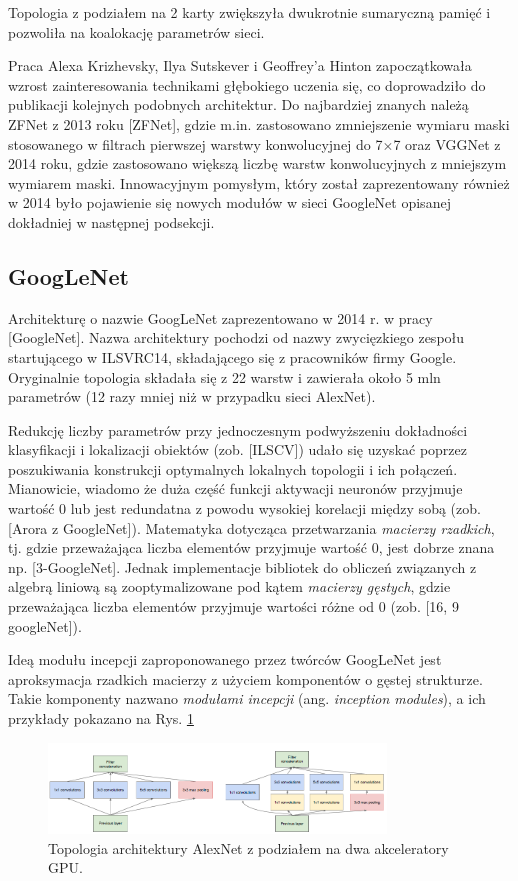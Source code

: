 Topologia z podziałem na 2 karty zwiększyła dwukrotnie sumaryczną pamięć i pozwoliła na koalokację parametrów sieci.

Praca Alexa Krizhevsky, Ilya Sutskever i Geoffrey'a Hinton zapoczątkowała wzrost zainteresowania technikami głębokiego uczenia się, co doprowadziło do publikacji kolejnych podobnych architektur. Do najbardziej znanych należą ZFNet z 2013 roku [ZFNet], gdzie m.in. zastosowano zmniejszenie wymiaru maski stosowanego w filtrach pierwszej warstwy konwolucyjnej do 7$\times$7 oraz VGGNet z 2014 roku, gdzie zastosowano większą liczbę warstw konwolucyjnych z mniejszym wymiarem maski. Innowacyjnym pomysłym, który został zaprezentowany również w 2014 było pojawienie się nowych modułów w sieci GoogleNet opisanej dokładniej w następnej podsekcji.

\subsection{GoogLeNet}

Architekturę o nazwie GoogLeNet zaprezentowano w 2014 r. w pracy [GoogleNet]. Nazwa architektury pochodzi od nazwy zwycięzkiego zespołu startującego w ILSVRC14, składającego się z pracowników firmy Google. Oryginalnie topologia składała się z 22 warstw i zawierała około 5 mln parametrów (12 razy mniej niż w przypadku sieci AlexNet). 

Redukcję liczby parametrów przy jednoczesnym podwyższeniu dokładności klasyfikacji i lokalizacji obiektów (zob. [ILSCV]) udało się uzyskać poprzez poszukiwania konstrukcji optymalnych lokalnych topologii i ich połączeń. Mianowicie, wiadomo że duża część funkcji aktywacji neuronów przyjmuje wartość 0 lub jest redundatna z powodu wysokiej korelacji między sobą (zob. [Arora z GoogleNet]). Matematyka dotycząca przetwarzania \textit{macierzy rzadkich}, tj. gdzie przeważająca liczba elementów przyjmuje wartość 0, jest dobrze znana np. [3-GoogleNet]. Jednak implementacje bibliotek do obliczeń związanych z algebrą liniową są zooptymalizowane pod kątem \textit{macierzy gęstych}, gdzie przeważająca liczba elementów przyjmuje wartości różne od 0 (zob. [16, 9 googleNet]). 

Ideą modułu incepcji zaproponowanego przez twórców GoogLeNet jest aproksymacja rzadkich macierzy z użyciem komponentów o gęstej strukturze. Takie komponenty nazwano \textit{modułami incepcji} (ang. \textit{inception modules}), a ich przykłady pokazano na Rys. \ref{GoogleNetInceptionModules} 
\begin{figure}[h!]
	\centering
	\includegraphics[width=0.8\textwidth]{figures/InceptionModules.png}
	\caption{Topologia architektury AlexNet z podziałem na dwa akceleratory GPU.}
	\label{GoogleNetInceptionModules}
\end{figure}


